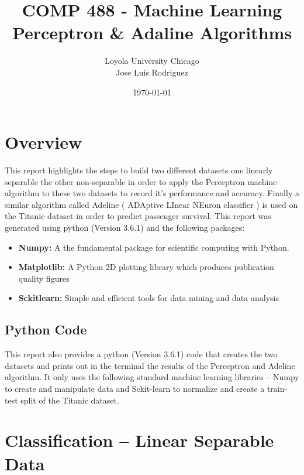 \documentclass[12pt]{article} %
\title{ COMP 488 - Machine Learning \\ Perceptron \& Adaline Algorithms} %
\author{
Loyola University Chicago \\
Jose Luis Rodriguez 
} %
\date{\today} %
\begin{document}
\maketitle
\thispagestyle{fancy}


\section{Overview}
This report highlights the steps to build two different datasets one linearly separable the other non-separable in order to apply the Perceptron machine algorithm to these two datasets to record it's performance and accuracy. Finally a similar algorithm called Adeline ( ADAptive LInear NEuron classifier ) is used on the Titanic dataset in order to predict passenger survival. This report was generated using python (Version 3.6.1) and the following packages:

\begin{itemize}
\item \textbf{Numpy:}  A the fundamental package for scientific computing with Python.
\item \textbf{Matplotlib:} A Python 2D plotting library which produces publication quality figures 
\item \textbf{Sckitlearn:} Simple and efficient tools for data mining and data analysis
\end{itemize}

\subsection{Python Code}
This report also provides a python (Version 3.6.1) code that creates the two datasets and prints out in the terminal the results of the Perceptron and Adeline algorithm. It only uses the following standard machine learning libraries -- Numpy to create and manipulate data and Sckit-learn to normalize and create a train-test split of the Titanic dataset.


\section{Classification -- Linear Separable Data}
\end{document}
